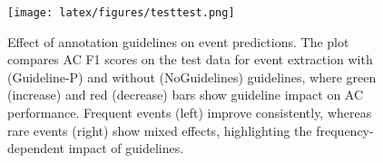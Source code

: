 \begin{figure}
    \centering
    \texttt{[image: latex/figures/testtest.png]}
    \caption{Effect of annotation guidelines on event predictions. The plot compares AC F1 scores on the test data for event extraction with (Guideline-P) and without (NoGuidelines) guidelines, where green (increase) and red (decrease) bars show guideline impact on AC performance. Frequent events (left) improve consistently, whereas rare events (right) show mixed effects, highlighting the frequency-dependent impact of guidelines.}
    \label{fig:error_it_div}
\end{figure}






